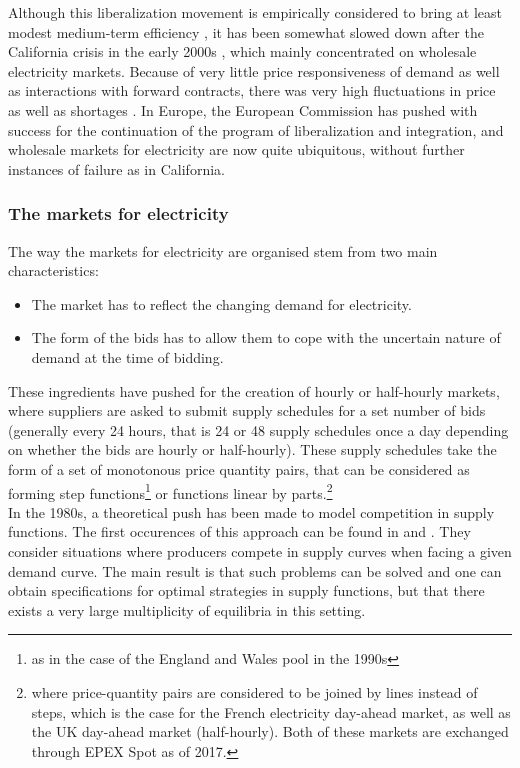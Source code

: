 Although this liberalization movement is empirically considered to bring at least modest medium-term efficiency \cite{fabrizio2007markets}, it has been somewhat slowed down after the California crisis in the early 2000s \cite{jamasb2005electricity}, which mainly concentrated on wholesale electricity markets. Because of very little price responsiveness of demand as well as interactions with forward contracts, there was very high fluctuations in price as well as shortages \cite{borenstein2002trouble}. In Europe, the European Commission has pushed with success for the continuation of the program of liberalization and integration, and wholesale markets for electricity are now quite ubiquitous, without further instances of failure as in California. 

\subsubsection*{The markets for electricity}
The way the markets for electricity are organised stem from two main characteristics:
\begin{itemize}
\item The market has to reflect the changing demand for electricity.
\item The form of the bids has to allow them to cope with the uncertain nature of demand at the time of bidding.
\end{itemize}

These ingredients have pushed for the creation of hourly or half-hourly markets, where suppliers are asked to submit supply schedules for a set number of bids (generally every 24 hours, that is 24 or 48 supply schedules once a day depending on whether the bids are hourly or half-hourly). These supply schedules take the form of a set of monotonous price quantity pairs, that can be considered as forming step functions\footnote{as in the case of the England and Wales pool in the 1990s} or functions linear by parts.\footnote{where price-quantity pairs are considered to be joined by lines instead of steps, which is the case for the French electricity day-ahead market, as well as the UK day-ahead market (half-hourly). Both of these markets are exchanged through EPEX Spot as of 2017.}\\

In the 1980s, a theoretical push has been made to model competition in supply functions. The first occurences of this approach can be found in \cite{grossman1981nash} and \cite{hart1982imperfect}. They consider situations where producers compete in supply curves when facing a given demand curve. The main result is that such problems can be solved and one can obtain specifications for optimal strategies in supply functions, but that there exists a very large multiplicity of equilibria in this setting.\\

